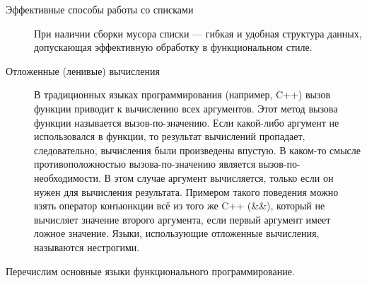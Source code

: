 \begin{description}
\item[Эффективные способы работы со списками] При наличии сборки
  мусора списки --- гибкая и удобная структура данных, допускающая
  эффективную обработку в функциональном стиле.
\item[Отложенные (ленивые) вычисления] В традиционных языках
  программирования (например, C++) вызов функции приводит к вычислению
  всех аргументов. Этот метод вызова функции называется
  вызов-по-значению. Если какой-либо аргумент не использовался в
  функции, то результат вычислений пропадает, следовательно,
  вычисления были произведены впустую. В каком-то смысле
  противоположностью вызова-по-значению является
  вызов-по-необходимости. В этом случае аргумент вычисляется, только
  если он нужен для вычисления результата. Примером такого поведения
  можно взять оператор конъюнкции всё из того же C++ (\&\&), который не
  вычисляет значение второго аргумента, если первый аргумент имеет
  ложное значение. Языки, использующие отложенные вычисления,
  называются нестрогими.
\end{description}

Перечислим основные языки функционального программирование.

